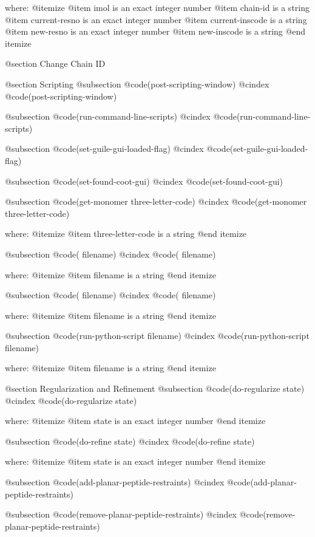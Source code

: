 where: 
 @itemize 
     @item imol is an exact integer number
     @item chain-id is a string
     @item current-resno is an exact integer number
     @item current-inscode is a string
     @item new-resno is an exact integer number
     @item new-inscode is a string
 @end itemize



@section Change Chain ID 

@section Scripting 
@subsection @code{(post-scripting-window)}
@cindex @code{(post-scripting-window)}
 
@subsection @code{(run-command-line-scripts)}
@cindex @code{(run-command-line-scripts)}
 
@subsection @code{(set-guile-gui-loaded-flag)}
@cindex @code{(set-guile-gui-loaded-flag)}
 
@subsection @code{(set-found-coot-gui)}
@cindex @code{(set-found-coot-gui)}
 
@subsection @code{(get-monomer three-letter-code)}
@cindex @code{(get-monomer three-letter-code)}
 
where: 
 @itemize 
     @item three-letter-code is a string
 @end itemize


@subsection @code{( filename)}
@cindex @code{( filename)}
 
where: 
 @itemize 
     @item filename is a string
 @end itemize


@subsection @code{( filename)}
@cindex @code{( filename)}
 
where: 
 @itemize 
     @item filename is a string
 @end itemize


@subsection @code{(run-python-script filename)}
@cindex @code{(run-python-script filename)}
 
where: 
 @itemize 
     @item filename is a string
 @end itemize



@section Regularization and Refinement 
@subsection @code{(do-regularize state)}
@cindex @code{(do-regularize state)}
 
where: 
 @itemize 
     @item state is an exact integer number
 @end itemize


@subsection @code{(do-refine state)}
@cindex @code{(do-refine state)}
 
where: 
 @itemize 
     @item state is an exact integer number
 @end itemize


@subsection @code{(add-planar-peptide-restraints)}
@cindex @code{(add-planar-peptide-restraints)}
 
@subsection @code{(remove-planar-peptide-restraints)}
@cindex @code{(remove-planar-peptide-restraints)}
 
